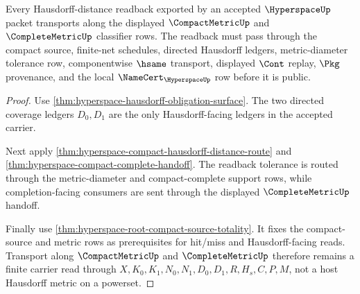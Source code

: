 \begin{theorem}
\label{thm:hyperspace-root-hausdorff-transport}
Every Hausdorff-distance readback exported by an accepted $\HyperspaceUp$ packet transports along the displayed $\CompactMetricUp$ and $\CompleteMetricUp$ classifier rows. The readback must pass through the compact source, finite-net schedules, directed Hausdorff ledgers, metric-diameter tolerance row, componentwise $\hsame$ transport, displayed $\Cont$ replay, $\Pkg$ provenance, and the local $\NameCert_{\HyperspaceUp}$ row before it is public.
\end{theorem}
\begin{proof}
Use \autoref{thm:hyperspace-hausdorff-obligation-surface}. The two directed coverage ledgers $D_0,D_1$ are the only Hausdorff-facing ledgers in the accepted carrier.

Next apply \autoref{thm:hyperspace-compact-hausdorff-distance-route} and \autoref{thm:hyperspace-compact-complete-handoff}. The readback tolerance is routed through the metric-diameter and compact-complete support rows, while completion-facing consumers are sent through the displayed $\CompleteMetricUp$ handoff.

Finally use \autoref{thm:hyperspace-root-compact-source-totality}. It fixes the compact-source and metric rows as prerequisites for hit/miss and Hausdorff-facing reads. Transport along $\CompactMetricUp$ and $\CompleteMetricUp$ therefore remains a finite carrier read through $X,K_0,K_1,N_0,N_1,D_0,D_1,R,H_s,C,P,M$, not a host Hausdorff metric on a powerset.
\end{proof}

